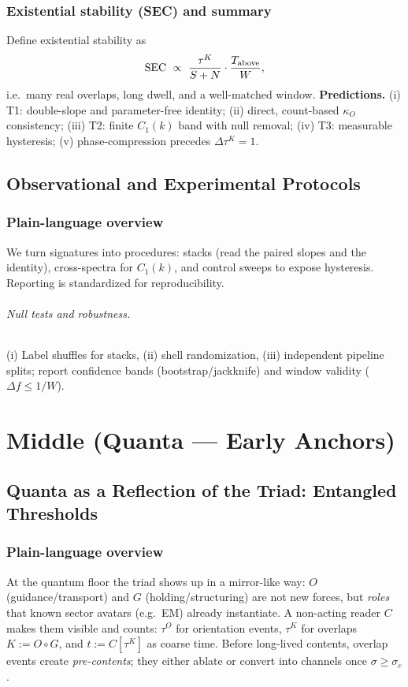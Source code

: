 \documentclass[12pt,a4paper,oneside]{scrreprt}
\begin{document}
\section{Existential stability (SEC) and summary}\label{sec:ur-predictions}
Define existential stability as
\[
\mathrm{SEC}\ \propto\ \frac{\tau^K}{S+N}\cdot\frac{T_{\rm above}}{W},
\]
i.e.\ many real overlaps, long dwell, and a well-matched window.  
\textbf{Predictions.} (i) T1: double-slope and parameter-free identity; (ii) direct, count-based $\kappa_O$ consistency; (iii) T2: finite $C_1(k)$ band with null removal; (iv) T3: measurable hysteresis; (v) phase-compression precedes $\Delta\tau^K=1$.

\chapter{Observational and Experimental Protocols}
\section*{Plain-language overview}
We turn signatures into procedures: stacks (read the paired slopes and the identity), cross-spectra for $C_1(k)$, and control sweeps to expose hysteresis. Reporting is standardized for reproducibility.

\paragraph{Null tests and robustness.}
(i) Label shuffles for stacks, (ii) shell randomization, (iii) independent pipeline splits; report confidence bands (bootstrap/jackknife) and window validity ($\Delta f\le 1/W$).

\part{Middle (Quanta — Early Anchors)}

\chapter{Quanta as a Reflection of the Triad: Entangled Thresholds}\label{ch:quanta-triad}

\section*{Plain-language overview}
At the quantum floor the triad shows up in a mirror-like way: $O$ (guidance/transport) and $G$ (holding/structuring) are not new forces, but \emph{roles} that known sector avatars (e.g.\ EM) already instantiate. A non-acting reader $C$ makes them visible and counts: $\tau^O$ for orientation events, $\tau^K$ for overlaps $K:=O\!\circ G$, and $t:=C[\tau^K]$ as coarse time. Before long-lived contents, overlap events create \emph{pre-contents}; they either ablate or convert into channels once $\sigma\ge\sigma_c$.
\end{document}
